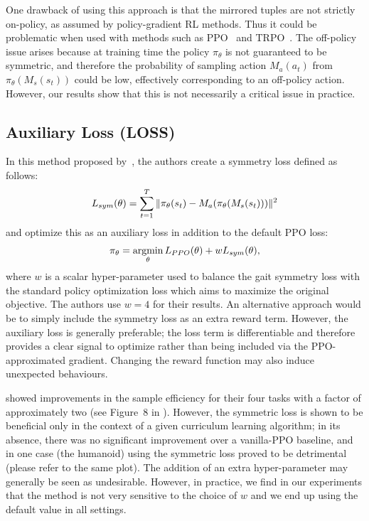 One drawback of using this approach is that the mirrored tuples are not strictly on-policy,
as assumed by policy-gradient RL methods. Thus it could be problematic when used with methods 
such as PPO~\citep{ppo} and TRPO~\citep{trpo}.  
The off-policy issue arises because at training time the policy $\pi_\theta$ is not guaranteed 
to be symmetric, and therefore the probability of sampling action $M_a(a_t)$ from $\pi_\theta(M_s(s_t))$ 
could be low, effectively corresponding to an off-policy action.
However, our results show that this is not necessarily a critical issue in practice.

\subsection{Auxiliary Loss (LOSS)}
In this method proposed by~\citeauthor{Yu-SIGGRAPH-2018}\cite{Yu-SIGGRAPH-2018}, 
the authors create a symmetry loss defined as follows:
\begin{align}
L_{sym}(\theta) = \sum_{t=1}^{T} \| \pi_\theta(s_t) - M_a ( \pi_\theta( M_s(s_t) ) ) \|^2
\end{align}
and optimize this as an auxiliary loss in addition to the default PPO loss:
\begin{align}
\pi_\theta = \mathop{\hbox{argmin}}_{\theta} L_{PPO}(\theta) + w L_{sym}(\theta),
\end{align}
where $w$ is a scalar hyper-parameter used to balance the gait symmetry loss
with the standard policy optimization loss which aims to maximize the original objective. 
The authors use $w=4$ for their results. 
An alternative approach would be to simply include the symmetry loss as an extra reward term. 
However, the auxiliary loss is generally preferable;
the loss term is differentiable and therefore provides a clear signal to optimize 
rather than being included via the PPO-approximated gradient.  
Changing the reward function may also induce unexpected behaviours.

\citet{Yu-SIGGRAPH-2018} showed improvements in the sample efficiency for their four tasks with a 
factor of approximately two (see Figure~8 in \cite{Yu-SIGGRAPH-2018}).
However, the symmetric loss is shown to be beneficial only in the context of a given curriculum learning algorithm;
in its absence, there was no significant improvement over a vanilla-PPO baseline,
and in one case (the humanoid) using the symmetric loss proved to be detrimental (please refer to the same plot).
The addition of an extra hyper-parameter may generally be seen as undesirable. 
However, in practice, we find in our experiments that the method is not very sensitive 
to the choice of $w$ and we end up using the default value in all settings.

